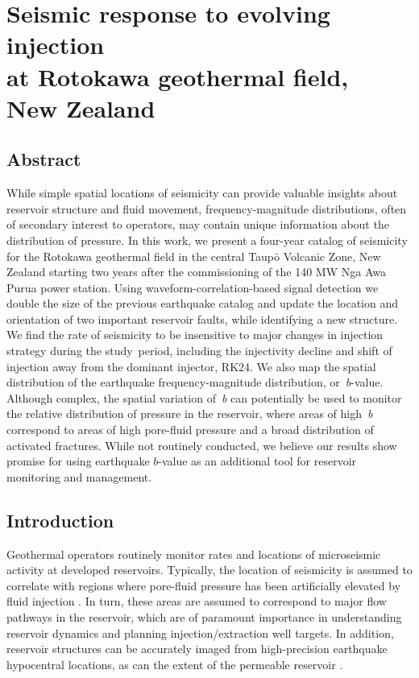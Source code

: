 \chapter[Seismic response to evolving injection at Rotokawa geothermal field, New Zealand]{Seismic response to evolving injection \\at Rotokawa geothermal field, \\New Zealand}

\section*{Abstract}
While simple spatial locations of seismicity can provide valuable
insights about reservoir structure and fluid movement,
frequency-magnitude distributions, often of secondary interest to
operators, may contain unique information about the distribution of
pressure. In this work, we present a four-year catalog of seismicity for
the Rotokawa geothermal field in the central Taup\={o} Volcanic Zone, New
Zealand starting two years after the commissioning of the 140 MW Nga Awa
Purua power station. Using waveform-correlation-based signal detection
we double the size of the previous earthquake catalog and update the
location and orientation of two important reservoir faults, while
identifying a new structure. We find the rate of seismicity
to be insensitive to major changes in injection strategy during the
study~period, including the \gls{injectivity} decline and shift of injection
away from the dominant injector, RK24. We also map the spatial
distribution of the earthquake frequency-magnitude distribution,
or~\emph{b}-value. Although complex, the spatial variation of~\emph{b}
can potentially be used to monitor the relative distribution of pressure
in the reservoir, where areas of high~\emph{b} correspond to areas of
high pore-fluid pressure and a broad distribution of activated fractures. While
not routinely conducted, we believe our results show promise for using
earthquake $b$-value as an additional tool for reservoir monitoring
and management.

\section{Introduction}
Geothermal operators routinely monitor rates and locations of microseismic activity at developed reservoirs. Typically, the location of seismicity is assumed to correlate with regions where pore-fluid pressure has been artificially elevated by fluid injection \citep[e.g.][]{Sherburn_2015,Garcia_2016}. In turn, these areas are assumed to correspond to major flow pathways in the reservoir, which are of paramount importance in understanding reservoir dynamics and planning injection\slash{extraction} well targets. In addition, reservoir structures can be accurately imaged from high-precision earthquake hypocentral locations, as can the extent of the permeable reservoir \citep{Sewell_2015WGC}.

